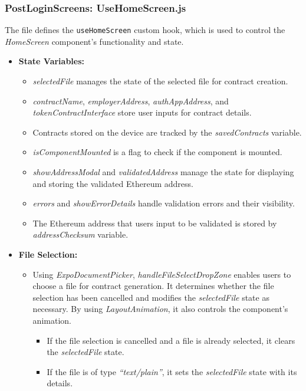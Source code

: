 \subsubsection{PostLoginScreens: UseHomeScreen.js}

The file defines the \texttt{useHomeScreen} custom hook, which is used to control the \textit{HomeScreen} component's functionality and state.

\begin{itemize}
    \item \textbf{State Variables:}
    \begin{itemize}
        \item \textit{selectedFile} manages the state of the selected file for contract creation.
        \item \textit{contractName}, \textit{employerAddress}, \textit{authAppAddress}, and \textit{tokenContractInterface} store user inputs for contract details.
        \item Contracts stored on the device are tracked by the \textit{savedContracts} variable.
        \item \textit{isComponentMounted} is a flag to check if the component is mounted.
        \item \textit{showAddressModal} and \textit{validatedAddress} manage the state for displaying and storing the validated Ethereum address.
        \item \textit{errors} and \textit{showErrorDetails} handle validation errors and their visibility.
        \item The Ethereum address that users input to be validated is stored by \textit{addressChecksum} variable.
    \end{itemize}

    \item \textbf{File Selection:}
    \begin{itemize}
        \item Using \textit{ExpoDocumentPicker}, \textit{handleFileSelectDropZone} enables users to choose a file for contract generation. It determines whether the file selection has been cancelled and modifies the \textit{selectedFile} state as necessary. By using \textit{LayoutAnimation}, it also controls the component's animation.
        \begin{itemize}
            \item If the file selection is cancelled and a file is already selected, it clears the \textit{selectedFile} state.
            \item If the file is of type \textit{``text/plain''}, it sets the \textit{selectedFile} state with its details.
        \end{itemize}
    \end{itemize}


\end{itemize}
